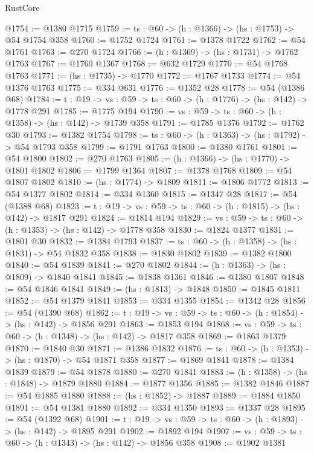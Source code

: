 \begin{lexlean}{RustCore}
\begin{coremodule}
@1754 := @1380 @1715
@1759 := {ts : @60} -> (h : @1366) -> (hs : @1753) -> @54 @1754 @358
@1760 := @1752 @1724
@1761 := @1378 @1722
@1762 := @54 @1761
@1763 := @270 @1724
@1766 := (h : @1369) -> (hs : @1731) -> @1762 @1763
@1767 := @1760 @1367
@1768 := @632 @1729
@1770 := @54 @1768 @1763
@1771 := (hs : @1735) -> @1770
@1772 := @1767 @1733
@1774 := @54 @1376 @1763
@1775 := @334 @631
@1776 := @1352 @28
@1778 := @54 (@1386 @68)
@1784 := {t : @19} -> {vs : @59} -> {ts : @60} -> (h : @1776) -> (hs : @142) -> @1778 @291
@1785 := @1775 @194
@1790 := {vs : @59} -> {ts : @60} -> (h : @1358) -> (hs : @142) -> @1739 @358
@1791 := @1785 @1376
@1792 := @1762 @30
@1793 := @1382 @1754
@1798 := {ts : @60} -> (h : @1363) -> (hs : @1792) -> @54 @1793 @358
@1799 := @1791 @1763
@1800 := @1380 @1761
@1801 := @54 @1800
@1802 := @270 @1763
@1805 := (h : @1366) -> (hs : @1770) -> @1801 @1802
@1806 := @1799 @1364
@1807 := @1378 @1768
@1809 := @54 @1807 @1802
@1810 := (hs : @1774) -> @1809
@1811 := @1806 @1772
@1813 := @54 @1377 @1802
@1814 := @334 @1360
@1815 := @1347 @28
@1817 := @54 (@1388 @68)
@1823 := {t : @19} -> {vs : @59} -> {ts : @60} -> (h : @1815) -> (hs : @142) -> @1817 @291
@1824 := @1814 @194
@1829 := {vs : @59} -> {ts : @60} -> (h : @1353) -> (hs : @142) -> @1778 @358
@1830 := @1824 @1377
@1831 := @1801 @30
@1832 := @1384 @1793
@1837 := {ts : @60} -> (h : @1358) -> (hs : @1831) -> @54 @1832 @358
@1838 := @1830 @1802
@1839 := @1382 @1800
@1840 := @54 @1839
@1841 := @270 @1802
@1844 := (h : @1363) -> (hs : @1809) -> @1840 @1841
@1845 := @1838 @1361
@1846 := @1380 @1807
@1848 := @54 @1846 @1841
@1849 := (hs : @1813) -> @1848
@1850 := @1845 @1811
@1852 := @54 @1379 @1841
@1853 := @334 @1355
@1854 := @1342 @28
@1856 := @54 (@1390 @68)
@1862 := {t : @19} -> {vs : @59} -> {ts : @60} -> (h : @1854) -> (hs : @142) -> @1856 @291
@1863 := @1853 @194
@1868 := {vs : @59} -> {ts : @60} -> (h : @1348) -> (hs : @142) -> @1817 @358
@1869 := @1863 @1379
@1870 := @1840 @30
@1871 := @1386 @1832
@1876 := {ts : @60} -> (h : @1353) -> (hs : @1870) -> @54 @1871 @358
@1877 := @1869 @1841
@1878 := @1384 @1839
@1879 := @54 @1878
@1880 := @270 @1841
@1883 := (h : @1358) -> (hs : @1848) -> @1879 @1880
@1884 := @1877 @1356
@1885 := @1382 @1846
@1887 := @54 @1885 @1880
@1888 := (hs : @1852) -> @1887
@1889 := @1884 @1850
@1891 := @54 @1381 @1880
@1892 := @334 @1350
@1893 := @1337 @28
@1895 := @54 (@1392 @68)
@1901 := {t : @19} -> {vs : @59} -> {ts : @60} -> (h : @1893) -> (hs : @142) -> @1895 @291
@1902 := @1892 @194
@1907 := {vs : @59} -> {ts : @60} -> (h : @1343) -> (hs : @142) -> @1856 @358
@1908 := @1902 @1381

\end{coremodule}
\end{lexlean}
